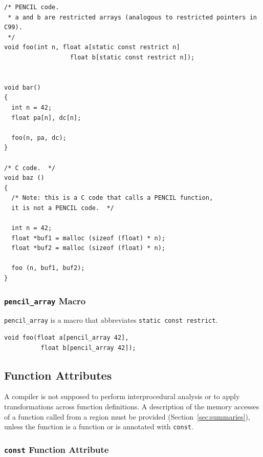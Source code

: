\begin{lstlisting}[language=pencil]
/* PENCIL code.
 * a and b are restricted arrays (analogous to restricted pointers in C99).
 */
void foo(int n, float a[static const restrict n]
                  float b[static const restrict n]);


void bar()
{
  int n = 42;
  float pa[n], dc[n];

  foo(n, pa, dc);
}

/* C code.  */
void baz ()
{
  /* Note: this is a C code that calls a PENCIL function,
  it is not a PENCIL code.  */

  int n = 42;
  float *buf1 = malloc (sizeof (float) * n);
  float *buf2 = malloc (sizeof (float) * n);

  foo (n, buf1, buf2);
}
\end{lstlisting}


\subsubsection{\texttt{pencil\_array} Macro}

\lstinline!pencil_array! is a macro that abbreviates
  \lstinline!static const restrict!.

  \begin{lstlisting}[language=pencil]
void foo(float a[pencil_array 42],
          float b[pencil_array 42]);
  \end{lstlisting}

\subsection{Function Attributes}

A \pencil compiler is not supposed to perform interprocedural analysis or to
apply transformations across function definitions.
A description of the memory accesses of a function called from a \pencil
region must be provided (Section~\ref{sec:summaries}),
unless the function is a \pencil function
or is annotated with \lstinline!const!.

\subsubsection{\texttt{const} Function Attribute}
\label{sec:const-attribute}


